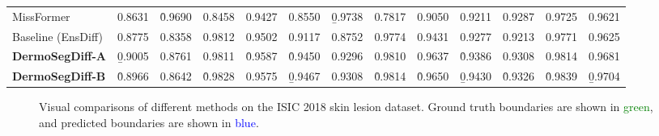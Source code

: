 \documentclass[runningheads]{llncs}
\begin{document}
\begin{table*}[!t]
{\begin{tabular}{l||cccc||cccc||cccc}
    MissFormer \cite{huang2021missformer}                  &   0.8631 &   \r{0.9690} &   0.8458 &   0.9427 &   0.8550 &\b{0.9738}&   0.7817 &   0.9050 &   0.9211 &   0.9287 &   0.9725 &   0.9621 
    \\
Baseline (EnsDiff) \cite{wolleb2022diffusion} &   0.8775 &   0.8358 &0.9812&   0.9502 &   0.9117 &   0.8752 &   0.9774 &   0.9431 &   0.9277 &   0.9213 &   0.9771 &   0.9625 
    \\
    \midrule
    \rowcolor[HTML]{C8FFFD}
    \bf{DermoSegDiff-A}                 &   \b{0.9005} &   0.8761 &   0.9811 &   \r{0.9587} &\r{0.9450}&   0.9296 &   0.9810 &   0.9637 &\r{0.9386}&   0.9308 & 0.9814 & 0.9681 
    \\
    \rowcolor[HTML]{C8FFFD}
    \bf{DermoSegDiff-B}                 &\r{0.8966} &   0.8642 &   \r{0.9828} &   0.9575   &\b{0.9467}&   0.9308 &\r{0.9814}&\r{0.9650}&\b{0.9430}&\r{0.9326}&\r{0.9839}&\b{0.9704}
    \\
\bottomrule
    \end{tabular}
    }
\end{table*}





\begin{figure}[!t]
    \centering
    \caption{Visual comparisons of different methods on the ISIC 2018 skin lesion dataset. Ground truth boundaries are shown
    in \textcolor{green}{green}, and predicted boundaries are shown in \textcolor{blue}{blue}.} 
    
    \label{fig:visualcomparison_isic}
\end{figure}
\end{document}
